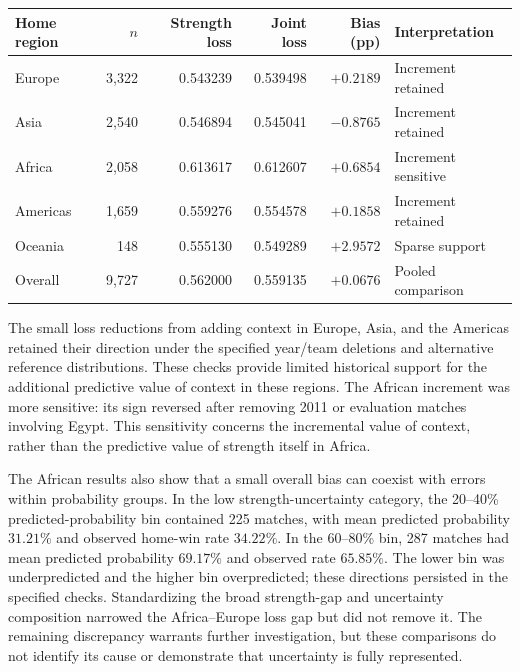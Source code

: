 \begin{table}[htbp]
\centering\small
{}
\label{tab:regional-diagnostics}
\begin{tabular}{lrrrrp{3.4cm}}
\toprule
Home region & $n$ & Strength loss & Joint loss & Bias (pp) & Interpretation \\
\midrule
Europe & 3,322 & 0.543239 & 0.539498 & $+0.2189$ & Increment retained \\
Asia & 2,540 & 0.546894 & 0.545041 & $-0.8765$ & Increment retained \\
Africa & 2,058 & 0.613617 & 0.612607 & $+0.6854$ & Increment sensitive \\
Americas & 1,659 & 0.559276 & 0.554578 & $+0.1858$ & Increment retained \\
Oceania & 148 & 0.555130 & 0.549289 & $+2.9572$ & Sparse support \\
Overall & 9,727 & 0.562000 & 0.559135 & $+0.0676$ & Pooled comparison \\
\bottomrule
\end{tabular}
\end{table}

The small loss reductions from adding context in Europe, Asia, and the Americas retained their direction under the specified year/team deletions and alternative reference distributions. These checks provide limited historical support for the additional predictive value of context in these regions. The African increment was more sensitive: its sign reversed after removing 2011 or evaluation matches involving Egypt. This sensitivity concerns the incremental value of context, rather than the predictive value of strength itself in Africa.

The African results also show that a small overall bias can coexist with errors within probability groups. In the low strength-uncertainty category, the 20--40\% predicted-probability bin contained 225 matches, with mean predicted probability $31.21\%$ and observed home-win rate $34.22\%$. In the 60--80\% bin, 287 matches had mean predicted probability $69.17\%$ and observed rate $65.85\%$. The lower bin was underpredicted and the higher bin overpredicted; these directions persisted in the specified checks. Standardizing the broad strength-gap and uncertainty composition narrowed the Africa--Europe loss gap but did not remove it. The remaining discrepancy warrants further investigation, but these comparisons do not identify its cause or demonstrate that uncertainty is fully represented.

